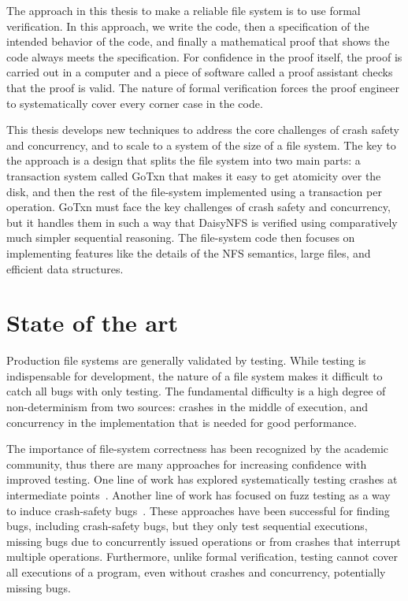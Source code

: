 The approach in this thesis to make a reliable file system is to use formal
verification. In this approach, we write the code, then a specification of the
intended behavior of the code, and finally a mathematical proof that shows the
code always meets the specification. For confidence in the proof itself, the
proof is carried out in a computer and a piece of software called a proof
assistant checks that the proof is valid. The nature of formal verification
forces the proof engineer to systematically cover every corner case in the code.

This thesis develops new techniques to address the core challenges of crash
safety and concurrency, and to scale to a system of the size of a file system.
The key to the approach is a design that splits the file system into two main
parts: a transaction system called GoTxn that makes it easy to get atomicity
over the disk, and then the rest of the file-system implemented using a
transaction per operation. GoTxn must face the key challenges of crash safety
and concurrency, but it handles them in such a way that DaisyNFS is verified
using comparatively much simpler sequential reasoning. The file-system code then
focuses on implementing features like the details of the NFS semantics, large
files, and efficient data structures.

\section{State of the art}

Production file systems are generally validated by testing. While testing is
indispensable for development, the nature of a file system makes it difficult to
catch all bugs with only testing. The fundamental difficulty is a high degree of
non-determinism from two sources: crashes in the middle of execution, and
concurrency in the implementation that is needed for good performance.

The importance of file-system correctness has been recognized by the academic
community, thus there are many approaches for increasing confidence with
improved testing. One line of work has explored systematically testing crashes
at intermediate points~\cite{mohan:crashmonkey,pillai:appcrash,yang:explode}. Another line of
work has focused on fuzz testing as a way to induce crash-safety
bugs~\cite{xu:janus,kim:hydra}. These approaches have been successful for
finding bugs, including crash-safety bugs, but they only test sequential
executions, missing bugs due to concurrently issued operations or from crashes
that interrupt multiple operations. Furthermore, unlike formal verification, testing cannot
cover all executions of a program, even without crashes and concurrency,
potentially missing bugs.

